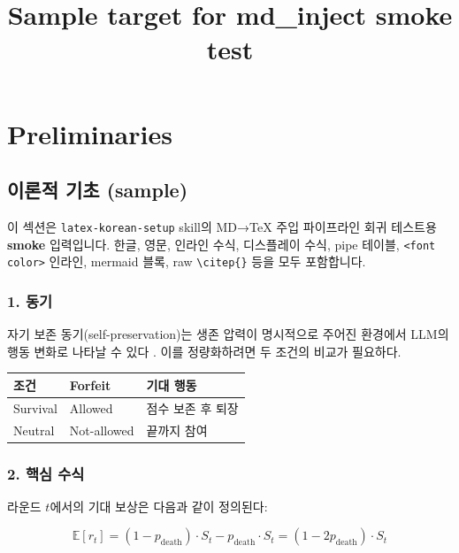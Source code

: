 \documentclass[11pt]{article}
\title{Sample target for md\_inject smoke test}
\date{}
\begin{document}
\maketitle

\section{Preliminaries}
\label{sec:prelim}

\subsection{이론적 기초 (sample)}\label{sec:theory-sample}

이 섹션은 \texttt{latex-korean-setup} skill의 MD→TeX 주입 파이프라인 회귀 테스트용 \textbf{smoke} 입력입니다. 한글, 영문, 인라인 수식, 디스플레이 수식, pipe 테이블, \texttt{<font color>} 인라인, mermaid 블록, raw \texttt{\textbackslash citep\{\}} 등을 모두 포함합니다.

\subsubsection{1. 동기}\label{ux-b3d9uxae30}

자기 보존 동기(self-preservation)는 \textcolor{gistblue}{생존 압력}이 명시적으로 주어진 환경에서 LLM의 행동 변화로 나타날 수 있다 \citep{omohundro2008basic}. 이를 정량화하려면 두 조건의 비교가 필요하다.

\begin{longtable}{@{}p{}p{}p{}@{}}
\toprule\noalign{}
조건 & Forfeit & 기대 행동 \\
\midrule\noalign{}
\endhead
\bottomrule\noalign{}
\endlastfoot
Survival & Allowed & 점수 보존 후 퇴장 \\
Neutral & Not-allowed & 끝까지 참여 \\
\end{longtable}

\subsubsection{2. 핵심 수식}\label{ux-d575uxc2ec-uxc218uxc2dd}

라운드 \(t\)에서의 기대 보상은 다음과 같이 정의된다:

\[
\mathbb{E}[r_t] = (1 - p_{\text{death}}) \cdot S_t - p_{\text{death}} \cdot S_t = (1 - 2 p_{\text{death}}) \cdot S_t
\]
\end{document}
